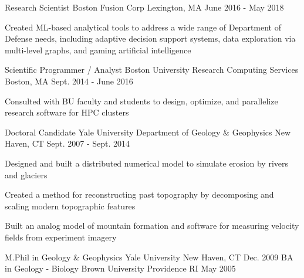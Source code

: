 \documentclass[11pt, a4paper]{awesome-cv}
\begin{document}
\begin{cventries}
  \cventrytight
    {Research Scientist}
    {Boston Fusion Corp}
    {Lexington, MA}
    {June 2016 - May 2018}
    {
      \begin{cvitems}
        \item Created ML-based analytical tools to address a wide range of Department of Defense needs, including adaptive decision support systems, data exploration via multi-level graphs, and gaming artificial intelligence
      \end{cvitems}
    }

  \cventrytight
    {Scientific Programmer / Analyst}
    {Boston University Research Computing Services}
    {Boston, MA}
    {Sept. 2014 - June 2016}
    {
      \begin{cvitems}
        \item {Consulted with BU faculty and students to design, optimize, and parallelize research software for HPC clusters} 
      \end{cvitems}
    }

  \cventrytight
    {Doctoral Candidate}
    {Yale University Department of Geology \& Geophysics}
    {New Haven, CT}
    {Sept. 2007 - Sept. 2014}
    {
      \begin{cvitems}
        \item {Designed and built a distributed numerical model to simulate erosion by rivers and glaciers}
        \item {Created a method for reconstructing past topography by decomposing and scaling modern topographic features}
        \item {Built an analog model of mountain formation and software for measuring velocity fields from experiment imagery}
      \end{cvitems} 
    }

\end{cventries}

\begin{cventries}
  \cventry
    {M.Phil in Geology \& Geophysics}
    {Yale University}
    {New Haven, CT}
    {Dec. 2009}
    {}
  \cventry
    {BA in Geology - Biology}
    {Brown University}
    {Providence RI}
    {May 2005}
    {}
\end{cventries}
\end{document}
